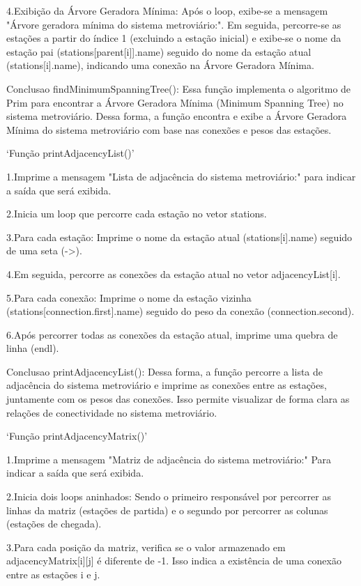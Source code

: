 4.Exibição da Árvore Geradora Mínima:
Após o loop, exibe-se a mensagem "Árvore geradora mínima do sistema metroviário:".
Em seguida, percorre-se as estações a partir do índice 1 (excluindo a estação inicial) e exibe-se o nome da estação pai (stations[parent[i]].name) seguido do nome da estação atual (stations[i].name), indicando uma conexão na Árvore Geradora Mínima.

Conclusao findMinimumSpanningTree():
Essa função implementa o algoritmo de Prim para encontrar a Árvore Geradora Mínima (Minimum Spanning Tree) no sistema metroviário.
Dessa forma, a função encontra e exibe a Árvore Geradora Mínima do sistema metroviário com base nas conexões e pesos das estações.

`Função printAdjacencyList()'

1.Imprime a mensagem "Lista de adjacência do sistema metroviário:" 
para indicar a saída que será exibida.

2.Inicia um loop que percorre cada estação no vetor stations.

3.Para cada estação: 
Imprime o nome da estação atual (stations[i].name) seguido de uma seta (->).

4.Em seguida, percorre as conexões da estação atual no vetor adjacencyList[i].

5.Para cada conexão:
Imprime o nome da estação vizinha (stations[connection.first].name) seguido do peso da conexão (connection.second).

6.Após percorrer todas as conexões da estação atual, imprime uma quebra de linha (endl).

Conclusao printAdjacencyList():
Dessa forma, a função percorre a lista de adjacência do sistema metroviário 
e imprime as conexões entre as estações, juntamente com os pesos das conexões. 
Isso permite visualizar de forma clara as relações de conectividade no sistema metroviário.

`Função printAdjacencyMatrix()'

1.Imprime a mensagem "Matriz de adjacência do sistema metroviário:" 
Para indicar a saída que será exibida.

2.Inicia dois loops aninhados:
Sendo o primeiro responsável por percorrer as linhas da matriz (estações de partida) e o segundo por percorrer as colunas (estações de chegada).

3.Para cada posição da matriz, verifica se o valor armazenado em adjacencyMatrix[i][j] é diferente de -1. Isso indica a existência de uma conexão entre as estações i e j.

